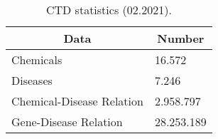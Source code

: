 \begin{table}[]
\caption{CTD statistics (02.2021).}
\centering
\begin{tabular}{|l|l|}
\hline
\multicolumn{1}{|c|}{\textbf{Data}} & \multicolumn{1}{c|}{\textbf{Number}} \\ \hline
Chemicals                  & 16.572                      \\ \hline
Diseases                   & 7.246                       \\ \hline
Chemical-Disease Relation  & 2.958.797                   \\ \hline
Gene-Disease Relation      & 28.253.189                  \\ \hline
\end{tabular}
\label{tab:ctd_stats}
\end{table}